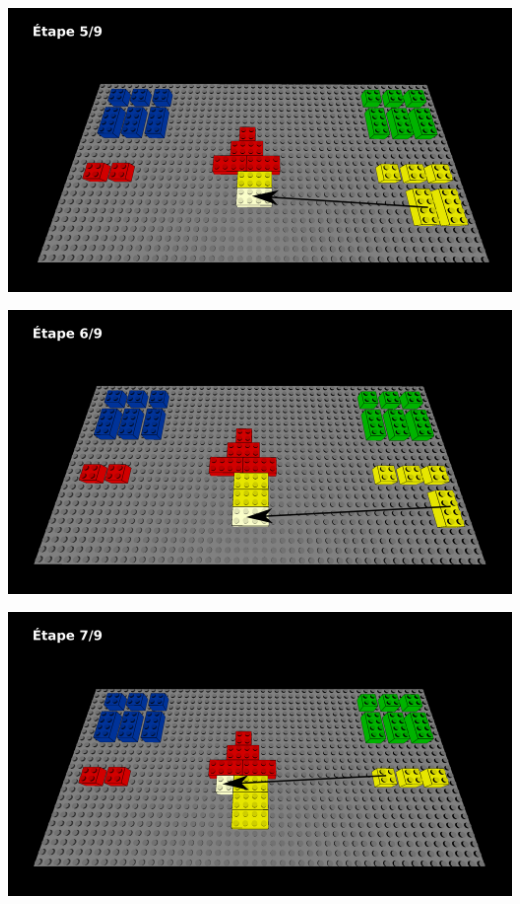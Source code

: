 \documentclass[aspectratio=169]{beamer}
\begin{document}
\begin{frame}
  \includegraphics[width=\linewidth]{step5.png}
\end{frame}

\begin{frame}
  \includegraphics[width=\linewidth]{step6.png}
\end{frame}

\begin{frame}
  \includegraphics[width=\linewidth]{step7.png}
\end{frame}
\end{document}
